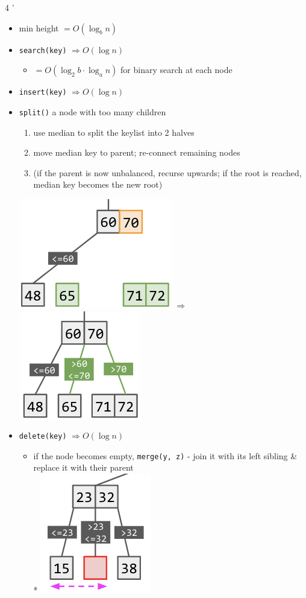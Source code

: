 \documentclass[10pt, landscape]{article}
\let\Then\Rightarrow
\newcommand{\code}[1]{\textcolor{myblue}{\texttt{#1}}}
\begin{document}
\begin{multicols}{4
    '}
\begin{itemize}
    \item min height $= O(\log_bn)$
    \item \code{search(key)} $\Then O(\log n)$
    \begin{itemize}
        \item $= O(\log_2 b \cdot \log_a n)$ for binary search at each node
    \end{itemize}
    \item \code{insert(key)} $\Then O(\log n)$
    \item \code{split()} a node with too many children
    \begin{enumerate}
        \item use median to split the keylist into 2 halves
        \item move median key to parent; re-connect remaining nodes
        \item (if the parent is now unbalanced, recurse upwards; if the root is reached, median key becomes the new root)
    \end{enumerate}
    \includegraphics[width=0.4\linewidth]{cs2040s-abtree-split-1.png}
    $\Then$
    \includegraphics[width=0.3\linewidth]{cs2040s-abtree-split-2.png}
    \item \code{delete(key)} $\Then O(\log n)$
    \begin{itemize}
        \item if the node becomes empty, \code{merge(y, z)} - join it with its left sibling \& replace it with their parent
        \\* \includegraphics[width=0.25\linewidth]{cs2040s-abtree-delete-1.png}

\end{itemize}
\end{itemize}
\end{multicols}
\end{document}
